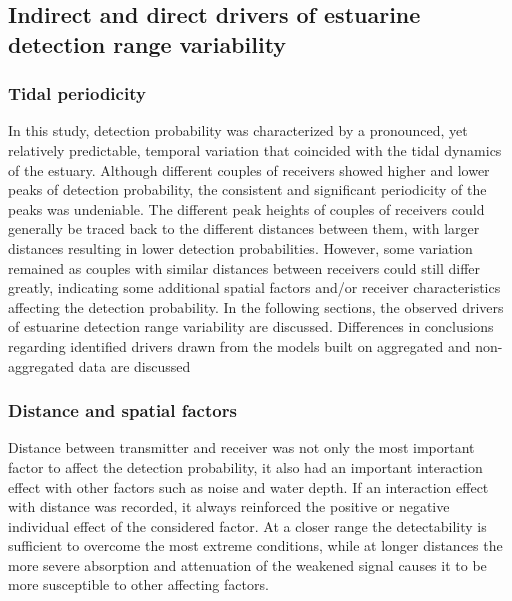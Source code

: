 \documentclass[doublespacing,linenumbers]{bmcart}
\begin{document}
\subsection*{Indirect and direct drivers of estuarine detection range variability}

\subsubsection*{Tidal periodicity}

In this study, detection probability was characterized by a pronounced, yet relatively predictable, temporal variation that coincided with the tidal dynamics of the estuary. Although different couples of receivers showed higher and lower peaks of detection probability, the consistent and significant periodicity of the peaks was undeniable. The different peak heights of couples of receivers could generally be traced back to the different distances between them, with larger distances resulting in lower detection probabilities. However, some variation remained as couples with similar distances between receivers could still differ greatly, indicating some additional spatial factors and/or receiver characteristics affecting the detection probability. In the following sections, the observed drivers of estuarine detection range variability are discussed. Differences in conclusions regarding identified drivers drawn from the models built on aggregated and non-aggregated data are discussed 

\subsubsection*{Distance and spatial factors}

Distance between transmitter and receiver was not only the most important factor to affect the detection probability, it also had an important interaction effect with other factors such as noise and water depth. If an interaction effect with distance was recorded, it always reinforced the positive or negative individual effect of the considered factor. At a closer range the detectability is sufficient to overcome the most extreme conditions, while at longer distances the more severe absorption and attenuation of the weakened signal causes it to be more susceptible to other affecting factors. 
\end{document}
